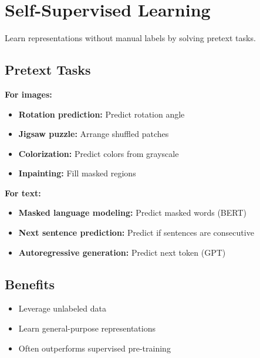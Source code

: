 
\section{Self-Supervised Learning }
\label{sec:self-supervised}

Learn representations without manual labels by solving pretext tasks.

\subsection{Pretext Tasks}

\textbf{For images:}
\begin{itemize}
    \item \textbf{Rotation prediction:} Predict rotation angle
    \item \textbf{Jigsaw puzzle:} Arrange shuffled patches
    \item \textbf{Colorization:} Predict colors from grayscale
    \item \textbf{Inpainting:} Fill masked regions
\end{itemize}

\textbf{For text:}
\begin{itemize}
    \item \textbf{Masked language modeling:} Predict masked words (BERT)
    \item \textbf{Next sentence prediction:} Predict if sentences are consecutive
    \item \textbf{Autoregressive generation:} Predict next token (GPT)
\end{itemize}

\subsection{Benefits}

\begin{itemize}
    \item Leverage unlabeled data
    \item Learn general-purpose representations
    \item Often outperforms supervised pre-training
\end{itemize}


